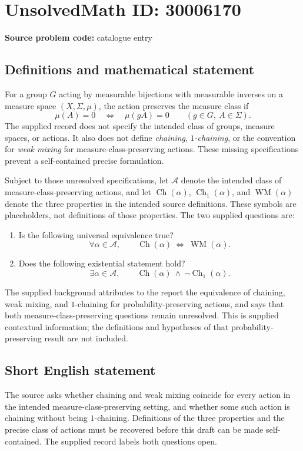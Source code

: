 \documentclass[11pt]{article}
\begin{document}
\section*{UnsolvedMath ID: 30006170}
\textbf{Source problem code:} catalogue entry
\subsection{Definitions and mathematical statement}
For a group \(G\) acting by measurable bijections with measurable inverses on a measure space \((X,\Sigma,\mu)\), the action preserves the measure class if
\[
\mu(A)=0\quad\Longleftrightarrow\quad\mu(gA)=0
\qquad(g\in G,\ A\in\Sigma).
\]
The supplied record does not specify the intended class of groups, measure spaces, or actions. It also does not define \emph{chaining}, \emph{\(1\)-chaining}, or the convention for \emph{weak mixing} for measure-class-preserving actions. These missing specifications prevent a self-contained precise formulation.

Subject to those unresolved specifications, let \(\mathcal A\) denote the intended class of measure-class-preserving actions, and let \(\operatorname{Ch}(\alpha)\), \(\operatorname{Ch}_1(\alpha)\), and \(\operatorname{WM}(\alpha)\) denote the three properties in the intended source definitions. These symbols are placeholders, not definitions of those properties. The two supplied questions are:
\begin{enumerate}
\item Is the following universal equivalence true?
\[
\forall\alpha\in\mathcal A,\qquad
\operatorname{Ch}(\alpha)\ \Longleftrightarrow\ \operatorname{WM}(\alpha).
\]
\item Does the following existential statement hold?
\[
\exists\alpha\in\mathcal A,\qquad
\operatorname{Ch}(\alpha)\ \land\ \neg\operatorname{Ch}_1(\alpha).
\]
\end{enumerate}
The supplied background attributes to the report the equivalence of chaining, weak mixing, and \(1\)-chaining for probability-preserving actions, and says that both measure-class-preserving questions remain unresolved. This is supplied contextual information; the definitions and hypotheses of that probability-preserving result are not included.
\subsection{Short English statement}
The source asks whether chaining and weak mixing coincide for every action in the intended measure-class-preserving setting, and whether some such action is chaining without being \(1\)-chaining. Definitions of the three properties and the precise class of actions must be recovered before this draft can be made self-contained. The supplied record labels both questions open.
\end{document}
